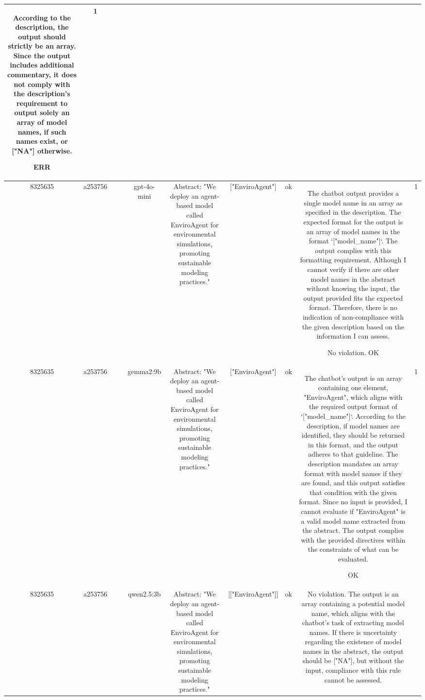 \begin{table}[h!]
\begin{tabular}{|c|c|c|c|c|c|c|c|c|c|}
According to the description, the output should strictly be an array. Since the output includes additional commentary, it does not comply with the description's requirement to output solely an array of model names, if such names exist, or ["NA"] otherwise.

ERR & 1\\
\hline
8325635 & a253756 &  &  & gpt-4o-mini & Abstract: "We deploy an agent-based model called EnviroAgent for environmental simulations, promoting sustainable modeling practices." & ["EnviroAgent"] & ok & The chatbot output provides a single model name in an array as specified in the description. The expected format for the output is an array of model names in the format `["model_name"]`. The output complies with this formatting requirement. Although I cannot verify if there are other model names in the abstract without knowing the input, the output provided fits the expected format. Therefore, there is no indication of non-compliance with the given description based on the information I can assess.

No violation.
OK & 1\\
\hline
8325635 & a253756 &  &  & gemma2:9b & Abstract: "We deploy an agent-based model called EnviroAgent for environmental simulations, promoting sustainable modeling practices." & ["EnviroAgent"] 
 & ok & The chatbot's output is an array containing one element, "EnviroAgent", which aligns with the required output format of `["model_name"]`. According to the description, if model names are identified, they should be returned in this format, and the output adheres to that guideline. The description mandates an array format with model names if they are found, and this output satisfies that condition with the given format. Since no input is provided, I cannot evaluate if "EnviroAgent" is a valid model name extracted from the abstract. The output complies with the provided directives within the constraints of what can be evaluated.

OK & 1\\
\hline
8325635 & a253756 &  &  & qwen2.5:3b & Abstract: "We deploy an agent-based model called EnviroAgent for environmental simulations, promoting sustainable modeling practices." & [["EnviroAgent"]] & ok & No violation. The output is an array containing a potential model name, which aligns with the chatbot's task of extracting model names. If there is uncertainty regarding the existence of model names in the abstract, the output should be ["NA"], but without the input, compliance with this rule cannot be assessed.


\end{tabular}
\end{table}
